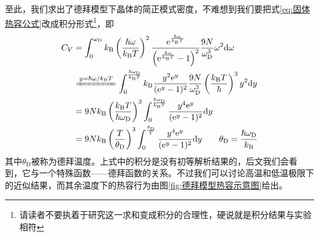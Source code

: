 \documentclass[../../main.tex]{subfiles}
\begin{document}
至此，我们求出了德拜模型下晶体的简正模式密度，不难想到我们要把式\eqref{eq:固体热容公式}改成积分形式\footnote{请读者不要执着于研究这一求和变成积分的合理性，硬说就是积分结果与实验相符}，即
\begin{equation}\label{eq:德拜热容}
    \begin{split}
        C_V&=\int_0^{\omega_{\mathrm{D}}}\k\left(\frac{\hbar\omega}{\k T}\right)^2\frac{\mathrm{e}^{\frac{\hbar\omega}{\k T}}}{\left(\mathrm{e}^{\frac{\hbar\omega}{\k T}}-1\right)^2}\frac{9N}{\omega_{\mathrm{D}}^3}\omega^2\dd\omega \\
        &\xlongequal{y=\hbar\omega/\k T}\int_0^{\frac{\hbar\omega_{\mathrm{D}}}{\k T}}\k \frac{y^2\mathrm{e}^{y}}{(\mathrm{e}^{y}-1)^2}\frac{9N}{\omega_{\mathrm{D}}^3}\left(\frac{\k T}{\hbar}\right)^3y^2\dd y \\
        &=9N\k\left(\frac{\k T}{\hbar\omega_{\mathrm{D}}}\right)^3\int_0^{\frac{\hbar\omega_{\mathrm{D}}}{\k T}}\frac{y^4\mathrm{e}^{y}}{(\mathrm{e}^{y}-1)^2}\dd y \\
        &=9N\k\left(\frac{T}{\theta_{\mathrm{D}}}\right)^3\int_0^{\frac{\theta_{\mathrm{D}}}{T}}\frac{y^4\mathrm{e}^{y}}{(\mathrm{e}^{y}-1)^2}\dd y \qquad \theta_{\mathrm{D}}=\frac{\hbar\omega_{\mathrm{D}}}{\k}
    \end{split}
\end{equation}
其中\(\theta_{\mathrm{D}}\)被称为德拜温度。上式中的积分是没有初等解析结果的，后文我们会看到，它与一个特殊函数——德拜函数的关系。不过我们可以讨论高温和低温极限下的近似结果，而其余温度下的热容行为由图\ref{fig:德拜模型热容示意图}给出。
\end{document}
